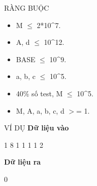RÀNG BUỘC
\begin{itemize}
	\item     M  $\le$  2*10^7.   
	\item     A, d  $\le$  10^12.   
	\item     BASE  $\le$  10^9.   
	\item     a, b, c  $\le$  10^5.   
	\item     40\% số test, M  $\le$  10^5.   
	\item     M, A, a, b, c, d $>$= 1.   
\end{itemize}
VÍ DỤ
\textbf{    Dữ liệu vào   }

   1 8 1 1 1 1 2  

\textbf{    Dữ liệu ra   }

   0